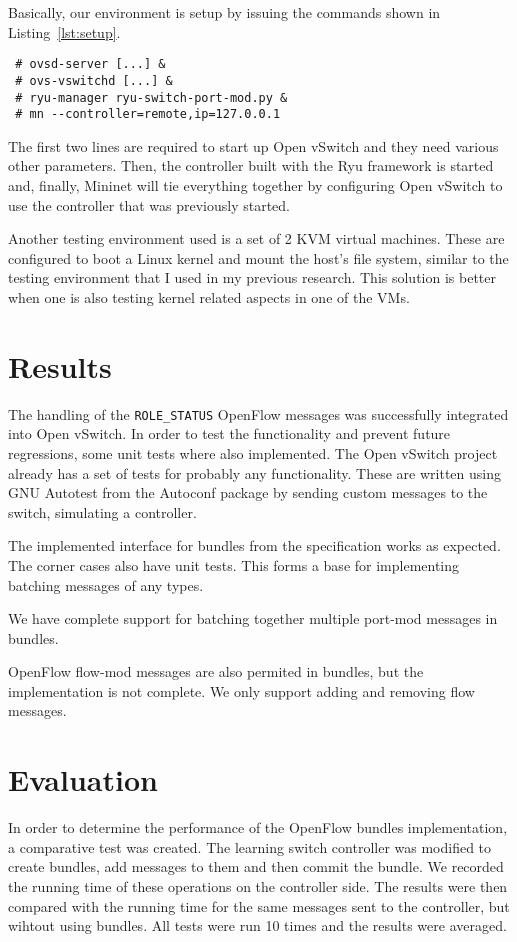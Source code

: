 Basically, our environment is setup by issuing the commands shown in Listing~\ref{lst:setup}.
\lstset{caption=Setting up the Development Environment,label=lst:setup}
\begin{lstlisting}
 # ovsd-server [...] &
 # ovs-vswitchd [...] &
 # ryu-manager ryu-switch-port-mod.py &
 # mn --controller=remote,ip=127.0.0.1
\end{lstlisting}
The first two lines are required to start up Open vSwitch and they need various other parameters.
Then, the controller built with the Ryu framework is started and, finally, Mininet will tie
everything together by configuring Open vSwitch to use the controller that was previously started.

Another testing environment used is a set of 2 KVM virtual machines. These are configured to
boot a Linux kernel and mount the host's file system, similar to the testing environment that
I used in my previous research. This solution is better when one is also testing kernel related
aspects in one of the VMs.

\section{Results}

The handling of the \texttt{ROLE_STATUS} OpenFlow messages was successfully integrated into Open vSwitch.
In order to test the functionality and prevent future regressions, some unit tests
where also implemented. The Open vSwitch project already has a set of tests for probably
any functionality. These are written using GNU Autotest from the Autoconf\cite{autoconf}
package by sending custom messages to the switch, simulating a controller.

The implemented interface for bundles from the specification works as expected. The corner cases also
have unit tests. This forms a base for implementing batching messages of any types.

We have complete support for batching together multiple port-mod messages in bundles.

OpenFlow flow-mod messages are also permited in bundles, but the implementation is not complete.
We only support adding and removing flow messages.


\section{Evaluation}

In order to determine the performance of the OpenFlow bundles implementation, a comparative test
was created. The learning switch controller was modified to create bundles, add messages to them
and then commit the bundle. We recorded the running time of these operations on the controller side.
The results were then compared with the running time for the same messages sent to the controller,
but wihtout using bundles. All tests were run 10 times and the results were averaged.

